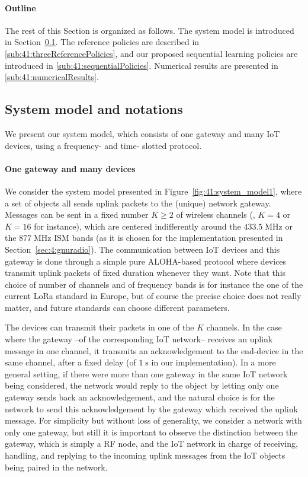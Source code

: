 \paragraph{Outline}
%
The rest of this Section is organized as follows. The system model is introduced in Section~\ref{sub:41:systemModel}. The reference policies are described in \ref{sub:41:threeReferencePolicies}, and our proposed sequential learning policies are introduced in \ref{sub:41:sequentialPolicies}.
Numerical results are presented in \ref{sub:41:numericalResults}.


\subsection{System model and notations}\label{sub:41:systemModel}

We present our system model, which consists of one gateway and many IoT devices, using a frequency- and time- slotted protocol.

\paragraph{One gateway and many devices}
%
We consider the system model presented in Figure~\ref{fig:41:system_model1}, where a set of objects all sends uplink packets to the (unique) network gateway.
Messages can be sent in a fixed number $K\geq2$ of wireless channels (\eg, $K=4$ or $K=16$ for instance), which are centered indifferently around the $433.5\;\mathrm{MHz}$ or the $877\;\mathrm{MHz}$ ISM bands (as it is chosen for the implementation presented in Section~\ref{sec:4:gnuradio}).
The communication between IoT devices and this gateway is done through a simple pure ALOHA-based protocol where devices transmit uplink packets of fixed duration whenever they want.
%
Note that this choice of number of channels and of frequency bands is for instance the one of the current LoRa standard in Europe, but of course the precise choice does not really matter, and future standards can choose different parameters.

The devices can transmit their packets in one of the $K$ channels. In the case where the gateway --of the corresponding IoT network-- receives an uplink message in one channel, it transmits an acknowledgement to the end-device in the same channel, after a fixed delay (of $1\;\mathrm{s}$ in our implementation).
In a more general setting, if there were more than one gateway in the same IoT network being considered, the network would reply to the object by letting only one gateway sends back an acknowledgement, and the natural choice is for the network to send this acknowledgement by the gateway which received the uplink message.
For simplicity but without loss of generality, we consider a network with only one gateway,
but still it is important to observe the distinction between the gateway, which is simply a RF node, and the IoT network in charge of receiving, handling, and replying to the incoming uplink messages from the IoT objects being paired in the network.
%

